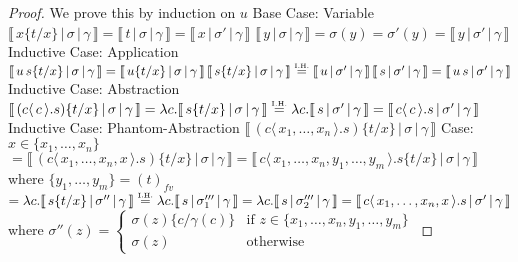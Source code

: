 \documentclass[a4paper,UKenglish,cleveref, autoref]{lipics-v2019}
\newcommand{\fv}[1]{(#1)_{fv}}
\newcommand{\set}[1]{ \{ #1 \} }
\newcommand{\abs}[2]{\lambda #1 . #2}
\newcommand{\app}[2]{#1 \, #2}
\newcommand{\fake}[3]{#1 \langle \, #2 \, \rangle . #3}
\newcommand{\sub}[3]{#1 \{ #2 / #3 \}}
\newcommand{\readbackwmap}[3]{\llbracket \, #1 \, \vert \, #2 \, \vert \, #3  \, \rrbracket }
\newcommand{\IH}{\stackrel{\hbox{\tiny I.H.}}{\hbox{=}}}
\begin{document}
\begin{proof}
We prove this by induction on $u$
\newline
\newline
Base Case: Variable
\newline
$\readbackwmap{x \sub{}{t}{x}}{\sigma}{\gamma} = \readbackwmap{t}{\sigma}{\gamma} = \readbackwmap{x}{\sigma'}{\gamma}$
\newline
\newline
$\readbackwmap{y}{\sigma}{\gamma} = \sigma(y) = \sigma'(y) = \readbackwmap{y}{\sigma'}{\gamma}$
\newline
\newline
Inductive Case: Application
\newline
$\readbackwmap{\app{u}{s} \sub{}{t}{x}}{\sigma}{\gamma} = \app{\readbackwmap{u \sub{}{t}{x}}{\sigma}{\gamma}}{\readbackwmap{s \sub{}{t}{x}}{\sigma}{\gamma}} \IH \app{\readbackwmap{u}{\sigma'}{\gamma}}{\readbackwmap{s}{\sigma'}{\gamma}} = \readbackwmap{\app{u}{s}}{\sigma'}{\gamma}$
\newline
\newline
Inductive Case: Abstraction
\newline
$\readbackwmap{(\fake{c}{c}{s}) \sub{}{t}{x}}{\sigma}{\gamma} = \abs{c}{\readbackwmap{s \sub{}{t}{x}}{\sigma}{\gamma}} \IH \abs{c}{\readbackwmap{s}{\sigma'}{\gamma}} = \readbackwmap{\fake{c}{c}{s}}{\sigma'}{\gamma}$
\newline
\newline
Inductive Case: Phantom-Abstraction
\newline
$\readbackwmap{(\fake{c}{x_{1}, \dots, x_{n}}{s}) \sub{}{t}{x}}{\sigma}{\gamma}$
\newline
\indent Case: $x \in \set{x_{1}, \dots, x_{n}}$
\newline
\indent $= \readbackwmap{(\fake{c}{x_{1}, \dots, x_{n}, x}{s}) \sub{}{t}{x}}{\sigma}{\gamma} = \readbackwmap{\fake{c}{x_{1}, \dots, x_{n}, y_{1}, \dots, y_{m}}{s} \sub{}{t}{x}}{\sigma}{\gamma}$
\newline
\indent where $\set{y_{1}, \dots, y_{m}} = \fv{t}$
\newline
\indent $= \abs{c}{\readbackwmap{s \sub{}{t}{x}}{\sigma''}{\gamma}} \IH \abs{c}{\readbackwmap{s}{\sigma'''_{1}}{\gamma}} = \abs{c}{\readbackwmap{s}{\sigma'''_{2}}{\gamma}} = \readbackwmap{\fake{c}{x_{1}, \dots, x_{n}, x}{s}}{\sigma'}{\gamma}$
\newline
\indent where $\sigma''(z) = \begin{cases} \sigma(z) \sub{}{c}{\gamma(c)} & \text{if } z \in \set{x_{1}, \dots, x_{n}, y_{1}, \dots, y_{m}} \\ \sigma(z) & \text{otherwise} \end{cases}$

\end{proof}
\end{document}
